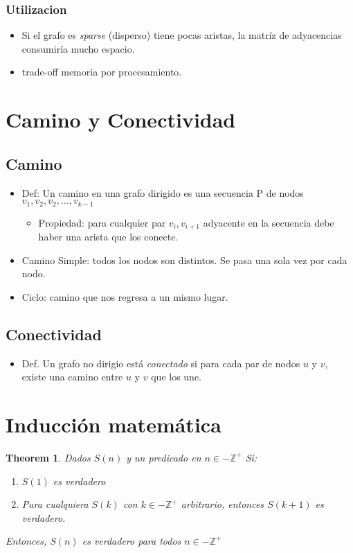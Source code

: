 \documentclass[12pt, fleqn]{article}
\newtheorem{theorem}{Theorem}[section]
\theoremstyle{definition}
\begin{document}
            \subsubsection{Utilizacion}
            \begin{itemize}
                \item Si el grafo es \emph{sparse} (disperso) tiene pocas aristas, la matríz de adyacencias consumiría mucho espacio.
                \item trade-off memoria por procesamiento.
            \end{itemize}
    \section{Camino y Conectividad}
    \subsection{Camino}
        \begin{itemize}
            \item Def: Un camino en una grafo dirigido es una secuencia P de nodos $v_1, v_2, v_2, \dots, v_{k-1}$
            \begin{itemize}
                \item Propiedad: para cualquier par $v_i, v_{i+1}$ adyacente en la secuencia debe haber una arista que los conecte.
            \end{itemize} 
            \item Camino Simple: todos los nodos son distintos. Se pasa una sola vez por cada nodo.
            \item Ciclo: camino que nos regresa a un mismo lugar. 
        \end{itemize} 
    \subsection{Conectividad}
        \begin{itemize}
            \item Def. Un grafo no dirigio está \emph{conectado} si para cada par de nodos $u$ y $v$, existe una camino entre $u$ y $v$ que los une.
        \end{itemize}
    \section{Inducción matemática}
        \begin{theorem}
            Dados $S(n)$ y un predicado en $n \in - \mathbb{Z}^+$ Si:
            \begin{enumerate}
                \item $S(1)$ es verdadero
                \item Para cualquiera $S(k)$ con $k \in - \mathbb{Z}^+$ arbitrario, entonces $S(k+1)$ es verdadero.
            \end{enumerate}
            Entonces, $S(n)$ es verdadero para todos $n \in - \mathbb{Z}^+$ 
        \end{theorem}
\end{document}
